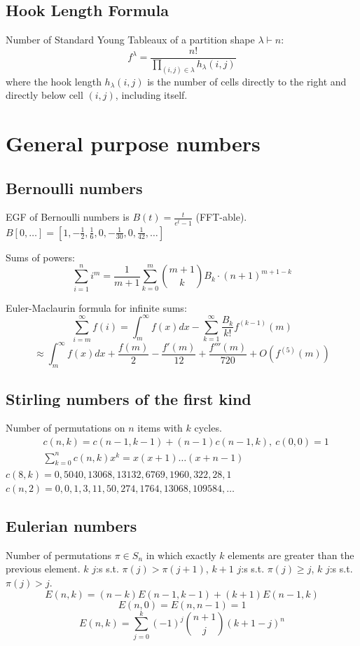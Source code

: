 	\subsection{Hook Length Formula}
        Number of Standard Young Tableaux of a partition shape $\lambda \vdash n$:
        \[ f^\lambda = \frac{n!}{\prod_{(i, j) \in \lambda} h_\lambda(i, j)} \]
        where the hook length $h_\lambda(i, j)$ is the number of cells directly to the right and directly below cell $(i,j)$, including itself.

\section{General purpose numbers}
	\subsection{Bernoulli numbers}
		EGF of Bernoulli numbers is $B(t)=\frac{t}{e^t-1}$ (FFT-able).
		$B[0,\ldots] = [1, -\frac{1}{2}, \frac{1}{6}, 0, -\frac{1}{30}, 0, \frac{1}{42}, \ldots]$

		Sums of powers:
		\small
		\[ \sum_{i=1}^n i^m =\frac{1}{m+1} \sum_{k=0}^m \binom{m+1}{k} B_k \cdot (n+1)^{m+1-k} \]
		\normalsize

		Euler-Maclaurin formula for infinite sums:
		\small
		\[ \sum_{i=m}^{\infty} f(i) = \int_m^\infty f(x) dx - \sum_{k=1}^\infty \frac{B_k}{k!}f^{(k-1)}(m) \]
		\[ \approx \int_{m}^\infty f(x)dx + \frac{f(m)}{2} - \frac{f'(m)}{12} + \frac{f'''(m)}{720} + O(f^{(5)}(m)) \]
		\normalsize

	\subsection{Stirling numbers of the first kind}
		Number of permutations on $n$ items with $k$ cycles.
		\begin{align*}
			&c(n,k) = c(n-1,k-1) + (n-1) c(n-1,k),\ c(0,0) = 1 \\
			&\textstyle \sum_{k=0}^n c(n,k)x^k = x(x+1) \dots (x+n-1)
		\end{align*}
		$c(8,k) = 0, 5040, 13068, 13132, 6769, 1960, 322, 28, 1$ \\
		$c(n,2) = 0, 0, 1, 3, 11, 50, 274, 1764, 13068, 109584, \dots$

	\subsection{Eulerian numbers}
		Number of permutations $\pi \in S_n$ in which exactly $k$ elements are greater than the previous element. $k$ $j$:s s.t. $\pi(j)>\pi(j+1)$, $k+1$ $j$:s s.t. $\pi(j)\geq j$, $k$ $j$:s s.t. $\pi(j)>j$.
		$$E(n,k) = (n-k)E(n-1,k-1) + (k+1)E(n-1,k)$$
		$$E(n,0) = E(n,n-1) = 1$$
		$$E(n,k) = \sum_{j=0}^k(-1)^j\binom{n+1}{j}(k+1-j)^n$$

